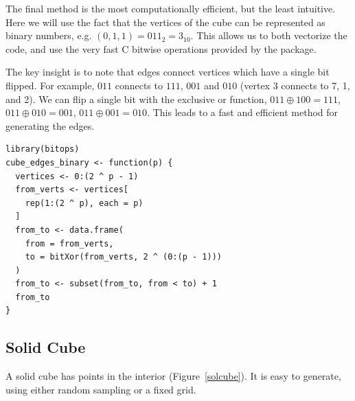 \begin{itemize}
    The final method is the most computationally efficient, but the
    least intuitive. Here we will use the fact that the vertices of
    the cube can be represented as binary numbers, e.g.  $(0, 1, 1) =
    011_2 = 3_{10}$. This allows us to both vectorize the code, and
    use the very fast C bitwise operations provided by the
     package.

    The key insight is to note that edges connect vertices which have
    a single bit flipped. For example, $011$ connects to $111$, $001$
    and $010$ (vertex 3 connects to 7, 1, and 2). We can flip a single
    bit with the exclusive or function, $011 \oplus 100 = 111$, $011
    \oplus 010 = 001$, $011 \oplus 001 = 010$.  This leads to a fast
    and efficient method for generating the edges.

\begin{verbatim}
library(bitops)
cube_edges_binary <- function(p) {
  vertices <- 0:(2 ^ p - 1)
  from_verts <- vertices[
    rep(1:(2 ^ p), each = p)
  ]
  from_to <- data.frame(
    from = from_verts,
    to = bitXor(from_verts, 2 ^ (0:(p - 1)))
  )
  from_to <- subset(from_to, from < to) + 1
  from_to
}
\end{verbatim}

\end{itemize}


\subsection{Solid Cube}

A solid cube has points in the interior (Figure~\ref{solcube}). It is
easy to generate, using either random sampling or a fixed grid.

